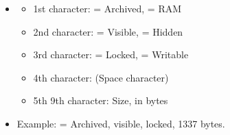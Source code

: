 \documentclass[letterpaper,10pt,english]{sphinxmanual}
\begin{document}
\begin{description}
\begin{description}
\begin{itemize}
\item {} \begin{description}
\begin{itemize}
\item {} 
\sphinxAtStartPar
1st character:  = Archived,  = RAM

\item {} 
\sphinxAtStartPar
2nd character:  = Visible,  = Hidden

\item {} 
\sphinxAtStartPar
3rd character:  = Locked,  = Writable

\item {} 
\sphinxAtStartPar
4th character: \sphinxcode{\sphinxupquote{\_}} (Space character)

\item {} 
\sphinxAtStartPar
5th \sphinxhyphen{} 9th character: Size, in bytes

\end{itemize}

\end{description}

\item {} 
\sphinxAtStartPar
Example:  = Archived, visible, locked, 1337 bytes.

\end{itemize}

\end{description}


\end{description}
\end{document}

